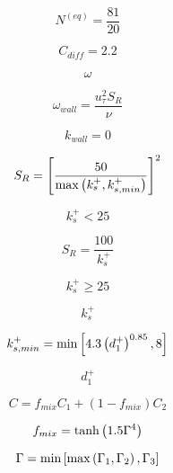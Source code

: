 \begin{equation}
N^{(eq)} = \frac{81}{20}
\end{equation}

\begin{equation}
C_{diff} = 2.2
\end{equation}

\begin{equation}
\omega
\end{equation}

\begin{equation}
\omega_{wall} = \frac{u_{\tau}^2 S_R}{\nu}
\end{equation}

\begin{equation}
k_{wall} = 0
\end{equation}

\begin{equation}
S_R = \left[ \frac{50}{{\rm max} \left(k_s^+, k_{s, min}^+ \right) } \right]^2
\end{equation}

\begin{equation}
k_s^+ < 25
\end{equation}

\begin{equation}
S_R = \frac{100}{k_s^+}
\end{equation}

\begin{equation}
k_s^+ \geq 25
\end{equation}

\begin{equation}
k_s^+ 
\end{equation}

\begin{equation}
k_{s, min}^+ = {\rm min} \left[ 4.3 \left(d_1^+ \right)^{0.85}, 8 \right]
\end{equation}

\begin{equation}
d_1^+
\end{equation}

\begin{equation}
C = f_{mix} C_1 + \left(1-f_{mix}\right) C_2
\end{equation}

\begin{equation}
f_{mix} = {\rm tanh} \left( 1.5 \Gamma^4 \right)
\end{equation}

\begin{equation}
\Gamma = {\rm min} \left[ {\rm max} \left( \Gamma_1, \Gamma_2 \right), \Gamma_3 \right]
\end{equation}


